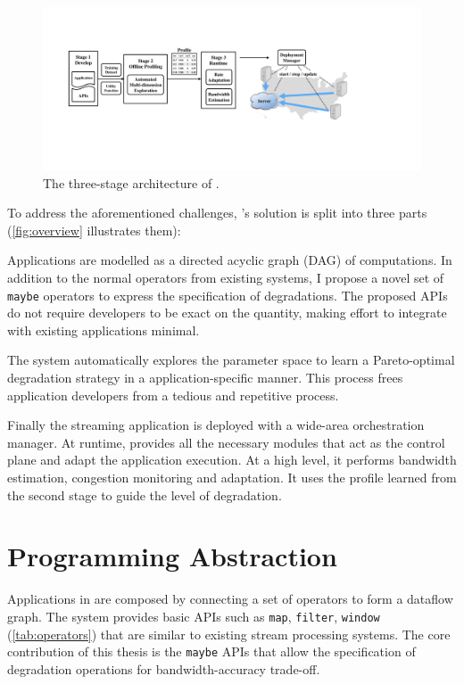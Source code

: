 \begin{figure}
  \centering
  \includegraphics[width=\linewidth]{figures/arch.pdf}
  \caption{The three-stage architecture of \sysname{}.}
  \label{fig:overview}
\end{figure}

To address the aforementioned challenges, \sysname{}'s solution is split into
three parts (\autoref{fig:overview} illustrates them):

 Applications are
modelled as a directed acyclic graph (DAG) of computations. In addition to the
normal operators from existing systems, I propose a novel set of \texttt{maybe}
operators to express the specification of degradations. The proposed APIs do not
require developers to be exact on the quantity, making effort to integrate with
existing applications minimal.

 The
system automatically explores the parameter space to learn a Pareto-optimal
degradation strategy in a application-specific manner. This process frees
application developers from a tedious and repetitive process.

 Finally the streaming
application is deployed with a wide-area orchestration manager. At runtime,
\sysname{} provides all the necessary modules that act as the control plane and
adapt the application execution. At a high level, it performs bandwidth
estimation, congestion monitoring and adaptation. It uses the profile learned
from the second stage to guide the level of degradation.

\section{Programming Abstraction}
\label{sec:prog-abs}

Applications in \sysname{} are composed by connecting a set of operators to form
a dataflow graph. The system provides basic APIs such as \texttt{map},
\texttt{filter}, \texttt{window} (\autoref{tab:operators}) that are similar to
existing stream processing systems. The core contribution of this thesis is the
\texttt{maybe} APIs that allow the specification of degradation operations for
bandwidth-accuracy trade-off.


